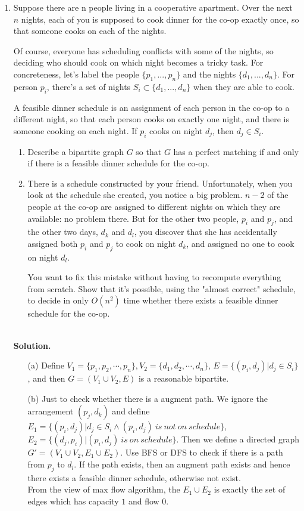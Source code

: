 \documentclass{article}
\begin{document}
\begin{enumerate}
\item Suppose there are n people living in a cooperative apartment. Over the next $n$ nights, each of you is supposed to cook dinner for the co-op exactly once, so that someone cooks on each of the nights.

Of course, everyone has scheduling conflicts with some of the nights, so deciding who should cook on which night becomes a tricky task. For concreteness, let's label the people $\{p_1, ..., p_n\}$ and the nights $\{d_1, ..., d_n\}$. For person $p_i$, there's a set of nights $S_i \subset \{d_1, ..., d_n\}$ when they are able to cook.

A feasible dinner schedule is an assignment of each person in the co-op to a different night, so that each person cooks on exactly one night, and there is someone cooking on each night. If $p_i$ cooks on night $d_j$, then $d_j \in S_i$.

\begin{enumerate}
    \item Describe a bipartite graph $G$ so that $G$ has a perfect matching if and only if there is a feasible dinner schedule for the co-op.
    \item There is a schedule constructed by your friend. Unfortunately, when you look at the schedule she created, you notice a big problem. $n-2$ of the people at the co-op are assigned to different nights on which they are available: no problem there. But for the other two people, $p_i$ and $p_j$, and the other two days, $d_k$ and $d_l$, you discover that she has accidentally assigned both $p_i$ and $p_j$ to cook on night $d_k$, and assigned no one to cook on night $d_l$. 
    
    You want to fix this mistake without having to recompute everything from scratch. Show that it's possible, using the "almost correct" schedule, to decide in only $O(n^2)$ time whether there exists a feasible dinner schedule for the co-op.
\end{enumerate}   


~\\
\textbf{Solution.}\\
\begin{enumerate}
\item [(a)] Define $V_1=\{p_1,p_2,\cdots,p_n\}, V_2=\{d_1,d_2,\cdots,d_n\}$, $E=\{(p_i,d_j)|d_j\in S_i\}$, and then $G=(V_1\cup V_2, E)$ is a reasonable bipartite.
\item [(b)] Just to check whether there is a augment path. We ignore the arrangement $(p_j, d_k)$ and define $E_1=\{(p_i,d_j)|d_j\in S_i\wedge (p_i,d_j)\ is\ not\ on\ schedule\}$, $E_2=\{(d_j, p_i)|(p_i, d_j)\ is\ on\ schedule\}$. Then we define a directed graph $G'=(V_1\cup V_2, E_1\cup E_2)$. Use BFS or DFS to check if there is a path from $p_j$ to $d_l$. If the path exists, then an augment path exists and hence there exists a feasible dinner schedule, otherwise not exist.\\ From the view of max flow algorithm, the $E_1\cup E_2$ is exactly the set of edges which has capacity $1$ and flow $0$.
\end{enumerate}
~\\


\end{enumerate}
\end{document}
